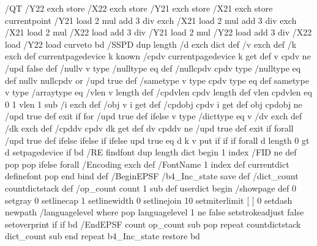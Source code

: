 /QT {
/Y22 exch store
/X22 exch store
/Y21 exch store
/X21 exch store
currentpoint
/Y21 load 2 mul add 3 div exch
/X21 load 2 mul add 3 div exch
/X21 load 2 mul /X22 load add 3 div
/Y21 load 2 mul /Y22 load add 3 div
/X22 load /Y22 load curveto
} bd
/SSPD {
dup length /d exch dict def
{
/v exch def
/k exch def
currentpagedevice k known {
/cpdv currentpagedevice k get def
v cpdv ne {
/upd false def
/nullv v type /nulltype eq def
/nullcpdv cpdv type /nulltype eq def
nullv nullcpdv or
{
/upd true def
} {
/sametype v type cpdv type eq def
sametype {
v type /arraytype eq {
/vlen v length def
/cpdvlen cpdv length def
vlen cpdvlen eq {
0 1 vlen 1 sub {
/i exch def
/obj v i get def
/cpdobj cpdv i get def
obj cpdobj ne {
/upd true def
exit
} if
} for
} {
/upd true def
} ifelse
} {
v type /dicttype eq {
v {
/dv exch def
/dk exch def
/cpddv cpdv dk get def
dv cpddv ne {
/upd true def
exit
} if
} forall
} {
/upd true def
} ifelse
} ifelse
} if
} ifelse
upd true eq {
d k v put
} if
} if
} if
} forall
d length 0 gt {
d setpagedevice
} if
} bd
/RE { %
  findfont dup length dict begin
  {
    1 index /FID ne
    {def} {pop pop} ifelse
  } forall
  /Encoding exch def
  /FontName 1 index def
  currentdict definefont pop
  end
} bind def
/BeginEPSF { %
/b4_Inc_state save def         %
/dict_count countdictstack def %
/op_count count 1 sub def      %
userdict begin                 %
/showpage { } def              %
0 setgray 0 setlinecap         %
1 setlinewidth 0 setlinejoin
10 setmiterlimit [ ] 0 setdash newpath
/languagelevel where           %
{pop languagelevel             %
1 ne                           %
{false setstrokeadjust false setoverprint
} if
} if
} bd
/EndEPSF { %
count op_count sub {pop} repeat            %
countdictstack dict_count sub {end} repeat
b4_Inc_state restore
} bd
